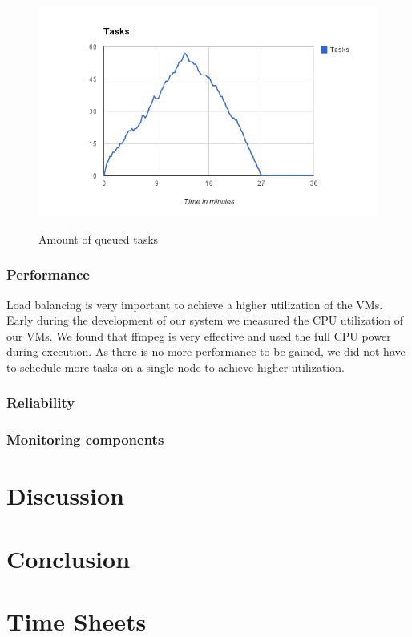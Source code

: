\documentclass[a4paper]{IEEEtran}
\begin{document}
\begin{figure}[ht]
	\includegraphics[scale=0.5]{fig/100tasks.png}
	\label{fig:100-tasks}
	\caption{Amount of queued tasks}
\end{figure}

\subsubsection{Performance}
Load balancing is very important to achieve a higher utilization of the VMs.
Early during the development of our system we measured the CPU utilization of our VMs.
We found that ffmpeg is very effective and used the full CPU power during execution.
As there is no more performance to be gained, we did not have to schedule more tasks on a single node to achieve higher utilization.

\subsubsection{Reliability}

\subsubsection{Monitoring components}


\section{Discussion}

\section{Conclusion}

\appendix
\section{Time Sheets}
\end{document}
